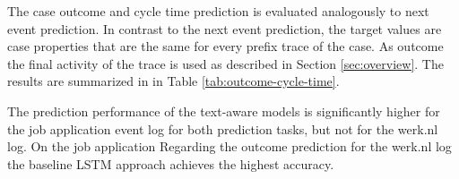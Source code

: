 The case outcome and cycle time prediction is evaluated analogously to next event prediction.
In contrast to the next event prediction, the target values are case properties that are the same for every prefix trace of the case.
As outcome the final activity of the trace is used as described in Section \ref{sec:overview}.
The results are summarized in in Table \ref{tab:outcome-cycle-time}.

The prediction performance of the text-aware models is significantly higher for the job application event log for both prediction tasks, but not for the werk.nl log.
On the job application
Regarding the outcome prediction for the werk.nl log the baseline LSTM approach achieves the highest accuracy.








